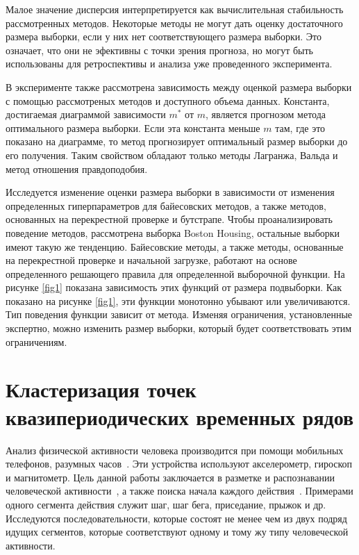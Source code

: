 Малое значение дисперсия интерпретируется как вычислительная стабильность рассмотренных методов. Некоторые методы не могут дать оценку достаточного размера выборки, если у них нет соответствующего размера выборки. Это означает, что они не эфективны с точки зрения прогноза, но могут быть использованы для ретроспективы и анализа уже проведенного эксперимента.

В эксперименте также рассмотрена зависимость между оценкой размера выборки с помощью рассмотреных методов и доступного объема данных. Константа, достигаемая диаграммой зависимости $m^*$ от $m$, является прогнозом метода оптимального размера выборки. Если эта константа меньше $m$ там, где это показано на диаграмме, то метод прогнозирует оптимальный размер выборки до его получения. Таким свойством обладают только методы Лагранжа, Вальда и метод отношения правдоподобия.

Исследуется изменение оценки размера выборки в зависимости от изменения определенных гиперпараметров для байесовских методов, а также методов, основанных на перекрестной проверке и бутстрапе. Чтобы проанализировать поведение методов, рассмотрена выборка {Boston Housing}, остальные выборки имеют такую же тенденцию.
Байесовские методы, а также методы, основанные на перекрестной проверке и начальной загрузке, работают на основе определенного решающего правила для определенной выборочной функции. На рисунке \ref{fig1} показана зависимость этих функций от размера подвыборки. Как показано на рисунке \ref{fig1}, эти функции монотонно убывают или увеличиваются. Тип поведения функции зависит от метода. Изменяя ограничения, установленные экспертно, можно изменить размер выборки, который будет соответствовать этим ограничениям.


\section{Кластеризация точек квазипериодических временных рядов}

Анализ физической активности человека производится при помощи мобильных телефонов, разумных часов~\cite{kwapisz2010, wang2014}. 
Эти устройства используют акселерометр, гироскоп и магнитометр. 
Цель данной работы заключается в  разметке и распознавании человеческой активности~\cite{Ignatov2015, Olivares2012, cinar2018}, а также поиска начала каждого действия~\cite{motrenko2015}. 
Примерами одного сегмента действия служит шаг, шаг бега, приседание, прыжок и др. 
Исследуются последовательности, которые состоят не менее чем из двух подряд идущих сегментов, которые соответствуют одному и тому жу типу человеческой активности.

